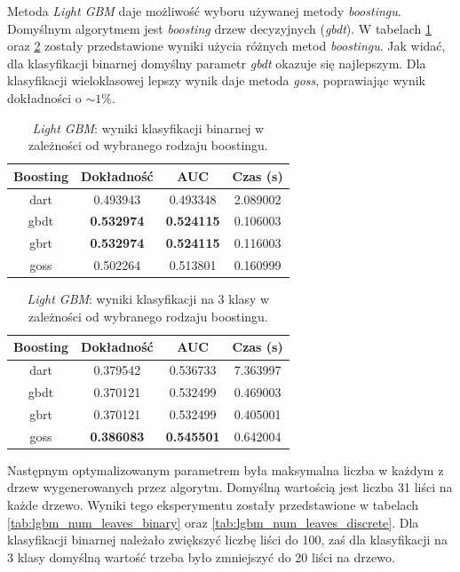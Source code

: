 \documentclass[a4paper, twoside, 11pt, openright]{article}
\begin{document}
Metoda \textit{Light GBM} daje możliwość wyboru używanej metody \textit{boostingu}. Domyślnym algorytmem jest \textit{boosting} drzew decyzyjnych (\textit{gbdt}). W tabelach \ref{tab:lgbm_boosting_binary} oraz \ref{tab:lgbm_boosting_discrete} zostały przedstawione wyniki użycia różnych metod \textit{boostingu}. Jak widać, dla klasyfikacji binarnej domyślny parametr \textit{gbdt} okazuje się najlepszym. Dla klasyfikacji wieloklasowej lepszy wynik daje metoda \textit{goss}, poprawiając wynik dokładności o $\sim 1\%$.

\begin{table}[H]
    \centering
    \begin{tabular}{|c|c|c|c|}
    \hline
        \textbf{Boosting} & \textbf{Dokładność} & \textbf{AUC} & \textbf{Czas (s)} \\ \hline
dart     &  0.493943 &  0.493348 &    2.089002 \\ \hline
gbdt     &  \textbf{0.532974} &  \textbf{0.524115} &    0.106003 \\ \hline
gbrt     &  \textbf{0.532974} &  \textbf{0.524115} &    0.116003 \\ \hline
goss     &  0.502264 &  0.513801 &    0.160999 \\ \hline
    \end{tabular}
    \caption{\textit{Light GBM}: wyniki klasyfikacji binarnej w zależności od wybranego rodzaju boostingu.}
    \label{tab:lgbm_boosting_binary}
\end{table}

\begin{table}[H]
    \centering
    \begin{tabular}{|c|c|c|c|}
    \hline
        \textbf{Boosting} & \textbf{Dokładność} & \textbf{AUC} & \textbf{Czas (s)} \\ \hline
dart     &  0.379542 &  0.536733 &    7.363997 \\ \hline
gbdt     &  0.370121 &  0.532499 &    0.469003 \\ \hline
gbrt     &  0.370121 &  0.532499 &    0.405001 \\ \hline
goss     &  \textbf{0.386083} &  \textbf{0.545501} &    0.642004 \\ \hline
    \end{tabular}
    \caption{\textit{Light GBM}: wyniki klasyfikacji na 3 klasy w zależności od wybranego rodzaju boostingu.}
    \label{tab:lgbm_boosting_discrete}
\end{table}

Następnym optymalizowanym parametrem była maksymalna liczba w każdym z drzew wygenerowanych przez algorytm. Domyślną wartością jest liczba 31 liści na każde drzewo. Wyniki tego eksperymentu zostały przedstawione w tabelach \ref{tab:lgbm_num_leaves_binary} oraz \ref{tab:lgbm_num_leaves_discrete}. Dla klasyfikacji binarnej należało zwiększyć liczbę liści do 100, zaś dla klasyfikacji na 3 klasy domyślną wartość trzeba było zmniejszyć do 20 liści na drzewo. 
\end{document}
